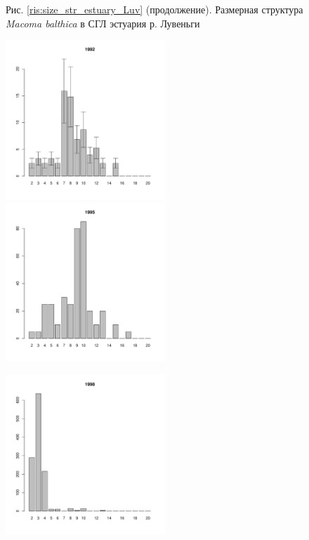 \documentclass[12pt, a4paper]{article}
\begin{document}
\begin{figure}[h]


\begin{center}
Рис. \ref{ris:size_str_estuary_Luv} (продолжение). Размерная структура {\it Macoma balthica} в СГЛ эстуария р. Лувеньги

\end{center}
\end{figure}

\newpage \begin{figure}[h] 

\begin{multicols}{3}
\hfill
\includegraphics[width=60mm]{../White_Sea/Luvenga_Goreliy/high2_1992_.pdf}
\hfill
\includegraphics[width=60mm]{../White_Sea/Luvenga_Goreliy/high2_1995_.pdf}

\hfill
\includegraphics[width=60mm]{../White_Sea/Luvenga_Goreliy/high2_1998_.pdf}


\end{multicols}
\end{figure}
\end{document}

